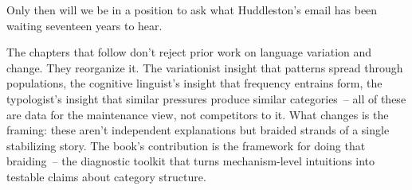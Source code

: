 Only then will we be in a position to ask what Huddleston's email has been waiting seventeen years to hear.

The chapters that follow don't reject prior work on language variation and change. They reorganize it. The variationist insight that patterns spread through populations, the cognitive linguist's insight that frequency entrains form, the typologist's insight that similar pressures produce similar categories~-- all of these are data for the maintenance view, not competitors to it. What changes is the framing: these aren't independent explanations but braided strands of a single stabilizing story. The book's contribution is the framework for doing that braiding~-- the diagnostic toolkit that turns mechanism-level intuitions into testable claims about category structure.
